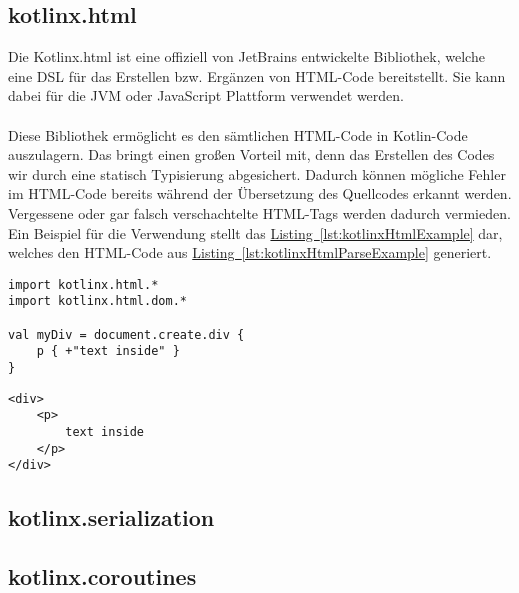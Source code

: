 \subsection{kotlinx.html}
Die Kotlinx.html ist eine offiziell von JetBrains entwickelte Bibliothek, welche eine \gls{DSL} für das Erstellen bzw. Ergänzen von HTML-Code bereitstellt. Sie kann dabei für die \gls{JVM} oder JavaScript Plattform verwendet werden.\\
\\
Diese Bibliothek ermöglicht es den sämtlichen HTML-Code in Kotlin-Code auszulagern. Das bringt einen großen Vorteil mit, denn das Erstellen des Codes wir durch eine statisch Typisierung abgesichert. Dadurch können mögliche Fehler im HTML-Code bereits während der Übersetzung des Quellcodes erkannt werden. Vergessene oder gar falsch verschachtelte HTML-Tags werden dadurch vermieden. Ein Beispiel für die Verwendung stellt das \hyperref[lst:kotlinxHtmlExample]{Listing~\ref{lst:kotlinxHtmlExample}} dar, welches den HTML-Code aus \hyperref[lst:kotlinxHtmlParseExample]{Listing~\ref{lst:kotlinxHtmlParseExample}} generiert.
\begin{lstlisting}[style=lstStyleFramed, caption={[Beispiel: Verwendung der Bibliothek kontlinx.html\protect\footnote{Quelle: \cite{kotlinxHtmlExample}}] Beispiel: Verwendung der Bibliothek kontlinx.html\protect\footnotemark}, label=lst:kotlinxHtmlExample]
import kotlinx.html.*
import kotlinx.html.dom.*

val myDiv = document.create.div {
	p { +"text inside" }
}
\end{lstlisting}
\begin{lstlisting}[style=lstStyleFramed, caption={Beispiel: Verwendung der Bibliothek kotlinx.html (Ergebnis)}, label=lst:kotlinxHtmlParseExample]
<div>
	<p>
		text inside
	</p>
</div>
\end{lstlisting}

\subsection{kotlinx.serialization}


\subsection{kotlinx.coroutines}



